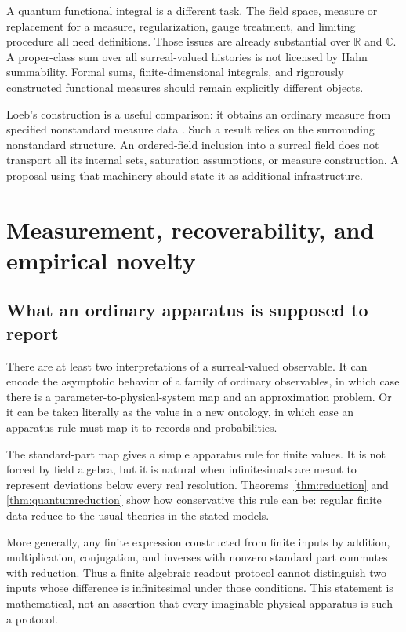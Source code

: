 \documentclass[11pt,a4paper]{article}
\numberwithin{equation}{section}
\theoremstyle{definition}
\theoremstyle{remark}
\newcommand{\R}{\mathbb R}
\newcommand{\C}{\mathbb C}
\begin{document}
A quantum functional integral is a different task. The field space, measure or replacement for a measure, regularization, gauge treatment, and limiting procedure all need definitions. Those issues are already substantial over $\R$ and $\C$. A proper-class sum over all surreal-valued histories is not licensed by Hahn summability. Formal sums, finite-dimensional integrals, and rigorously constructed functional measures should remain explicitly different objects.

Loeb's construction is a useful comparison: it obtains an ordinary measure from specified nonstandard measure data \cite{Loeb}. Such a result relies on the surrounding nonstandard structure. An ordered-field inclusion into a surreal field does not transport all its internal sets, saturation assumptions, or measure construction. A proposal using that machinery should state it as additional infrastructure.

\section{Measurement, recoverability, and empirical novelty}
\label{sec:measurement}

\subsection{What an ordinary apparatus is supposed to report}
There are at least two interpretations of a surreal-valued observable. It can encode the asymptotic behavior of a family of ordinary observables, in which case there is a parameter-to-physical-system map and an approximation problem. Or it can be taken literally as the value in a new ontology, in which case an apparatus rule must map it to records and probabilities.

The standard-part map gives a simple apparatus rule for finite values. It is not forced by field algebra, but it is natural when infinitesimals are meant to represent deviations below every real resolution. Theorems~\ref{thm:reduction} and \ref{thm:quantumreduction} show how conservative this rule can be: regular finite data reduce to the usual theories in the stated models.

More generally, any finite expression constructed from finite inputs by addition, multiplication, conjugation, and inverses with nonzero standard part commutes with reduction. Thus a finite algebraic readout protocol cannot distinguish two inputs whose difference is infinitesimal under those conditions. This statement is mathematical, not an assertion that every imaginable physical apparatus is such a protocol.
\end{document}
